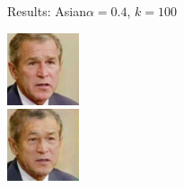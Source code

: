 \documentclass[11pt]{beamer}
\begin{document}
\begin{frame}{Results: Asian}{$\alpha=0.4$, $k=100$}
	\begin{minipage}{81px}
		\includegraphics[width=80px]{../pictures/outputs/start-imgs/Bush.png}\\
		\includegraphics[width=80px]{../pictures/outputs/asian_alpha0.4_k100/Bush.png}
	\end{minipage}
\end{frame}
\end{document}
